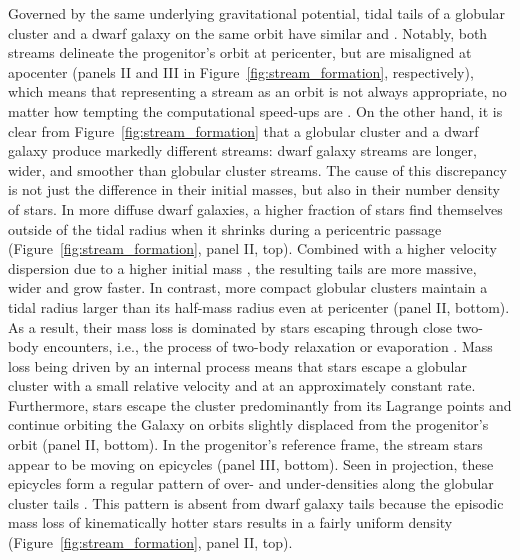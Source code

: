 \documentclass[final,5p,times,twocolumn,authoryear]{elsarticle}
\begin{document}
Governed by the same underlying gravitational potential, tidal tails of a globular cluster and a dwarf galaxy on the same orbit have similar  and .
Notably, both streams delineate the progenitor's orbit at pericenter, but are misaligned at apocenter (panels II and III in Figure~\ref{fig:stream_formation}, respectively), which means that representing a stream as an orbit is not always appropriate, no matter how tempting the computational speed-ups are \citep{eyre:2009, eyre:2011, sanders:2013a, sanders:2013b}.
On the other hand, it is clear from Figure~\ref{fig:stream_formation} that a globular cluster and a dwarf galaxy produce markedly different streams: dwarf galaxy streams are longer, wider, and smoother than globular cluster streams.
The cause of this discrepancy is not just the difference in their initial masses, but also in their number density of stars.
In more diffuse dwarf galaxies, a higher fraction of stars find themselves outside of the tidal radius when it shrinks during a pericentric passage (Figure~\ref{fig:stream_formation}, panel II, top).
Combined with a higher velocity dispersion due to a higher initial mass \citep[cf.][]{simon:2007, baumgardt:2019}, the resulting tails are more massive, wider and grow faster.
In contrast, more compact globular clusters maintain a tidal radius larger than its half-mass radius even at pericenter (panel II, bottom).
As a result, their mass loss is dominated by stars escaping through close two-body encounters, i.e., the process of two-body relaxation or evaporation \citep{gnedin:1997,vesperini:1997,baumgardt:2003}.
Mass loss being driven by an internal process means that stars escape a globular cluster with a small relative velocity and at an approximately constant rate.
Furthermore, stars escape the cluster predominantly from its Lagrange points and continue orbiting the Galaxy on orbits slightly displaced from the progenitor's orbit (panel II, bottom).
In the progenitor's reference frame, the stream stars appear to be moving on epicycles (panel III, bottom).
Seen in projection, these epicycles  form a regular pattern of over- and under-densities along the globular cluster tails \citep[Figure~\ref{fig:stream_formation}, panel II, bottom;][]{kupper:2008, kupper:2010, just:2009}.
This pattern is absent from dwarf galaxy tails because the episodic mass loss of kinematically hotter stars results in a fairly uniform density (Figure~\ref{fig:stream_formation}, panel II, top).
\end{document}
